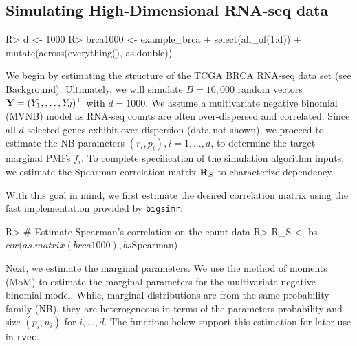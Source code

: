 \documentclass[
]{jss}
\begin{document}
\hypertarget{simulating-high-dimensional-rna-seq-data}{%
\subsection{Simulating High-Dimensional RNA-seq data}\label{simulating-high-dimensional-rna-seq-data}}

\begin{CodeChunk}
\begin{CodeInput}
R> d <- 1000
R> brca1000 <- example_brca %
+   select(all_of(1:d)) %
+   mutate(across(everything(), as.double))
\end{CodeInput}
\end{CodeChunk}

We begin by estimating the structure of the TCGA BRCA RNA-seq data set (see \href{background}{Background}). Ultimately, we will simulate \(B=10,000\) random vectors \({\bf Y}=(Y_1, \ldots, Y_d)^\top\) with \(d=1000\). We assume a multivariate negative binomial (MVNB) model as RNA-seq counts are often over-dispersed and correlated. Since all \(d\) selected genes exhibit over-dispersion (data not shown), we proceed to estimate the NB parameters \((r_i, p_i), i=1,\ldots,d\), to determine the target marginal PMFs \(f_i\). To complete specification of the simulation algorithm inputs, we estimate the Spearman correlation matrix \({ \bf R}_{S}\) to characterize dependency.

With this goal in mind, we first estimate the desired correlation matrix using the fast implementation provided by \texttt{bigsimr}:

\begin{CodeChunk}
\begin{CodeInput}
R> # Estimate Spearman's correlation on the count data
R> R_S <- bs$cor(as.matrix(brca1000), bs$Spearman)
\end{CodeInput}
\end{CodeChunk}

Next, we estimate the marginal parameters. We use the method of moments (MoM) to estimate the marginal parameters for the multivariate negative binomial model. While, marginal distributions are from the same probability family (NB), they are heterogeneous in terms of the parameters probability and size \((p_i, n_i)\) for \(i,\ldots,d\). The functions below support this estimation for later use in \texttt{rvec}.

\begin{CodeChunk}
\end{CodeChunk}
\end{document}
